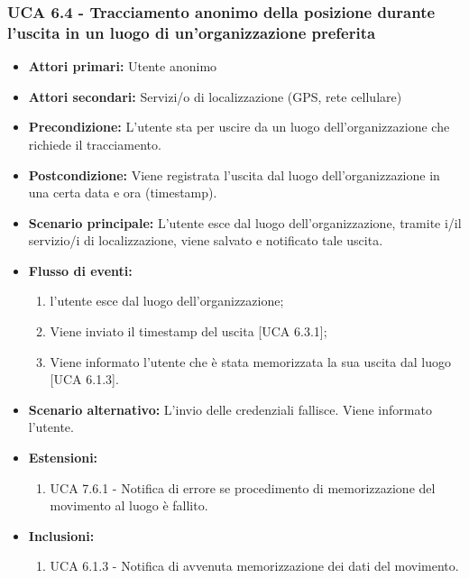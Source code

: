 \subsubsection{UCA 6.4 - Tracciamento anonimo della posizione durante l'uscita in un luogo di un'organizzazione preferita}
\begin{itemize}
	\item \textbf{Attori primari:} Utente anonimo
	\item \textbf{Attori secondari:} Servizi/o di localizzazione (GPS, rete cellulare)
	\item \textbf{Precondizione:} L'utente sta per uscire da un luogo dell'organizzazione che richiede il tracciamento.
	\item \textbf{Postcondizione:} Viene registrata l'uscita dal luogo dell'organizzazione in una certa data e ora (timestamp).
	\item \textbf{Scenario principale:} L'utente esce dal luogo dell'organizzazione, tramite i/il servizio/i di localizzazione, viene salvato e notificato tale uscita. 
	\item \textbf{Flusso di eventi:}
	\begin{enumerate}
		\item l'utente esce dal luogo dell'organizzazione;
		\item Viene inviato il timestamp  del uscita [UCA 6.3.1];
		\item Viene informato l'utente che è stata memorizzata la sua uscita dal luogo [UCA 6.1.3].
	\end{enumerate}
	\item \textbf{Scenario alternativo:} L'invio delle credenziali fallisce. Viene informato l'utente.
	\item \textbf{Estensioni:}
	\begin{enumerate}
		\item UCA 7.6.1 - Notifica di errore se procedimento di memorizzazione del movimento al luogo è fallito.
	\end{enumerate}
	\item \textbf{Inclusioni:}
	\begin{enumerate}
		\item UCA 6.1.3 - Notifica di avvenuta memorizzazione dei dati del movimento.
	\end{enumerate}
\end{itemize}